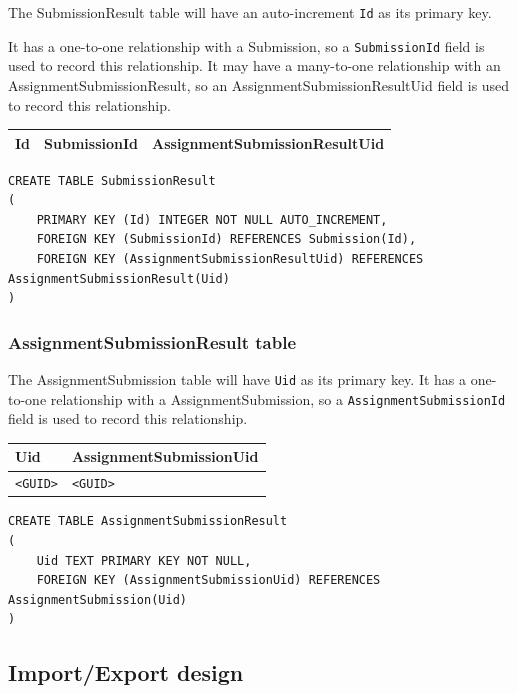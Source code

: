 \documentclass[a4paper]{report}
\begin{document}
The SubmissionResult table will have an auto-increment \texttt{Id} as its primary key.

It has a one-to-one relationship with a Submission, so a \texttt{SubmissionId} field is used to record this relationship. It may have a many-to-one relationship with an AssignmentSubmissionResult, so an AssignmentSubmissionResultUid field is used to record this relationship. 

\begin{tabulary}{\textwidth}{|L|L|L|}
    \hline
    Id & SubmissionId & AssignmentSubmissionResultUid \\
    \hline
\end{tabulary}

\begin{verbatim}
CREATE TABLE SubmissionResult
(
    PRIMARY KEY (Id) INTEGER NOT NULL AUTO_INCREMENT,
    FOREIGN KEY (SubmissionId) REFERENCES Submission(Id),
    FOREIGN KEY (AssignmentSubmissionResultUid) REFERENCES AssignmentSubmissionResult(Uid)
)
\end{verbatim}

\subsubsection{AssignmentSubmissionResult table}

The AssignmentSubmission table will have \texttt{Uid} as its primary key. It has a one-to-one relationship with a AssignmentSubmission, so a \texttt{AssignmentSubmissionId} field is used to record this relationship.

\begin{tabulary}{\textwidth}{|L|L|}
    \hline
    Uid & AssignmentSubmissionUid \\
    \hline
    \texttt{<GUID>} & \texttt{<GUID>} \\
    \hline
\end{tabulary}

\begin{verbatim}
CREATE TABLE AssignmentSubmissionResult
(
    Uid TEXT PRIMARY KEY NOT NULL,
    FOREIGN KEY (AssignmentSubmissionUid) REFERENCES AssignmentSubmission(Uid)
)
\end{verbatim}

\subsection{Import/Export design}
\end{document}

